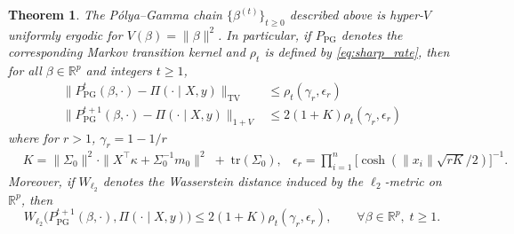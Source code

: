 \documentclass[ejsv2, noshowframe]{imsart}
\theoremstyle{plain}
\newtheorem{theorem}{Theorem}[section]
\theoremstyle{definition}
\theoremstyle{remark}
\newcommand{\e}{\epsilon}
\newcommand{\tr}{\text{tr}}
\newcommand{\R}{\mathbb{R}}
\begin{document}
\begin{theorem} \label{thm:pg_convergence}
The P\'olya--Gamma chain $\{\beta^{(t)}\}_{t\ge 0}$ described above is hyper-$V$ uniformly ergodic for $V(\beta) = \|\beta\|^2$. In particular, if $P_{\mathrm{PG}}$ denotes the corresponding Markov transition kernel and $\rho_{t}$ is defined by \eqref{eq:sharp_rate}, then for all $\beta \in \R^p$ and integers $t \ge 1$,
\begin{align*}
\| P_{\mathrm{PG}}^{t}(\beta,\cdot) - \Pi(\cdot \mid X, y) \|_{\mathrm{TV}}
&\le 
\rho_{t}(\gamma_r, \e_r)
\\
\| P_{\mathrm{PG}}^{t + 1}(\beta,\cdot) - \Pi(\cdot \mid X, y) \|_{1 + V}
&\le 2 (1 + K) \rho_{t}(\gamma_r, \e_r)
\end{align*}
where for $r > 1$, $\gamma_r = 1 - 1/r$
\begin{align*}
&K = \|\Sigma_0\|^2 \cdot \|X^\top \kappa + \Sigma_0^{-1} m_0\|^2
\;+\; \tr(\Sigma_0),
&\e_r = \prod_{i=1}^n \big[ \cosh( \|x_i\|\sqrt{rK} /2 ) \big]^{-1}.
\end{align*}
Moreover, if $W_{ \ell_2 }$ denotes the Wasserstein distance induced by the $\ell_2$-metric on $\mathbb{R}^p$, then 
\[
W_{ \ell_2 }\big(P_{\mathrm{PG}}^{t+1}(\beta,\cdot), \Pi(\cdot \mid X, y) \big)
\le  2 (1 + K) \rho_{t}(\gamma_r, \e_r),
\qquad \forall \beta \in \R^p,\; t \ge 1.
\]
\end{theorem}
\end{document}
